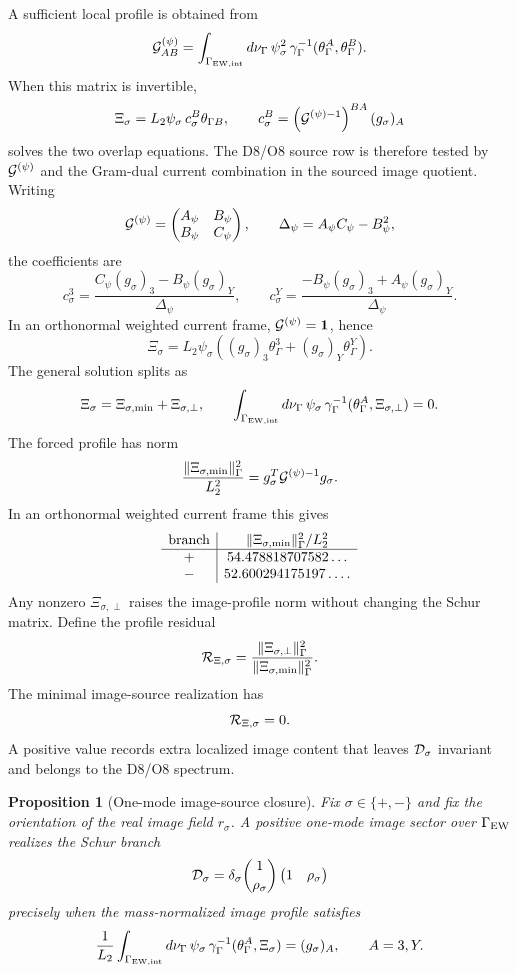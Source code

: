 \documentclass[11pt]{article}
\newtheorem{proposition}{Proposition}
\theoremstyle{definition}
\theoremstyle{remark}
\begin{document}
A sufficient local profile is obtained from
\[
  {\cal G}_{AB}^{(\psi)}
  =
  \int_{\Gamma_{\rm EW,int}}d\nu_\Gamma\,
  \psi_\sigma^2\,
  \gamma_\Gamma^{-1}(\theta_\Gamma^A,\theta_\Gamma^B).
\]
When this matrix is invertible,
\[
  \Xi_\sigma
  =
  L_2\psi_\sigma\,
  c_\sigma^B\theta_{\Gamma B},
  \qquad
  c_\sigma^B
  =
  \left({\cal G}^{(\psi)-1}\right)^{BA}(g_\sigma)_A
\]
solves the two overlap equations.  The D8/O8 source row is therefore tested by
\({\cal G}^{(\psi)}\) and the Gram-dual current combination in the
sourced image quotient.
Writing
\[
  {\cal G}^{(\psi)}
  =
  \begin{pmatrix}
  A_\psi&B_\psi\\
  B_\psi&C_\psi
  \end{pmatrix},
  \qquad
  \Delta_\psi=A_\psi C_\psi-B_\psi^2,
\]
the coefficients are
\[
  c_\sigma^3
  =
  \frac{C_\psi(g_\sigma)_3-B_\psi(g_\sigma)_Y}{\Delta_\psi},
  \qquad
  c_\sigma^Y
  =
  \frac{-B_\psi(g_\sigma)_3+A_\psi(g_\sigma)_Y}{\Delta_\psi}.
\]
In an orthonormal weighted current frame,
\({\cal G}^{(\psi)}=\mathbf 1\), hence
\[
  \Xi_\sigma
  =
  L_2\psi_\sigma
  \left((g_\sigma)_3\theta_\Gamma^3
  +(g_\sigma)_Y\theta_\Gamma^Y\right).
\]
The general solution splits as
\[
  \Xi_\sigma
  =
  \Xi_{\sigma,\min}+\Xi_{\sigma,\perp},
  \qquad
  \int_{\Gamma_{\rm EW,int}}d\nu_\Gamma\,
  \psi_\sigma\,
  \gamma_\Gamma^{-1}(\theta_\Gamma^A,\Xi_{\sigma,\perp})=0 .
\]
The forced profile has norm
\[
  \frac{\|\Xi_{\sigma,\min}\|_\Gamma^2}{L_2^2}
  =
  g_\sigma^T{\cal G}^{(\psi)-1}g_\sigma .
\]
In an orthonormal weighted current frame this gives
\[
\begin{array}{c|c}
{\rm branch}&\|\Xi_{\sigma,\min}\|_\Gamma^2/L_2^2\\ \hline
+&54.478818707582\ldots\\
-&52.600294175197\ldots .
\end{array}
\]
Any nonzero \(\Xi_{\sigma,\perp}\) raises the image-profile norm without
changing the Schur matrix.
Define the profile residual
\[
  {\cal R}_{\Xi,\sigma}
  =
  \frac{\|\Xi_{\sigma,\perp}\|_\Gamma^2}
       {\|\Xi_{\sigma,\min}\|_\Gamma^2}.
\]
The minimal image-source realization has
\[
  {\cal R}_{\Xi,\sigma}=0 .
\]
A positive value records extra localized image content that leaves
\({\cal D}_\sigma\) invariant and belongs to the D8/O8 spectrum.

\begin{proposition}[One-mode image-source closure]
Fix \(\sigma\in\{+,-\}\) and fix the orientation of the real image field
\(r_\sigma\).  A positive one-mode image sector over \(\Gamma_{\rm EW}\)
realizes the Schur branch
\[
  {\cal D}_\sigma
  =
  \delta_\sigma
  \binom{1}{\rho_\sigma}
  \begin{pmatrix}1&\rho_\sigma\end{pmatrix}
\]
precisely when the mass-normalized image profile satisfies
\[
  \frac{1}{L_2}
  \int_{\Gamma_{\rm EW,int}}d\nu_\Gamma\,
  \psi_\sigma\,
  \gamma_\Gamma^{-1}(\theta_\Gamma^A,\Xi_\sigma)
  =
  (g_\sigma)_A,
  \qquad A=3,Y .
\]
\end{proposition}
\end{document}

